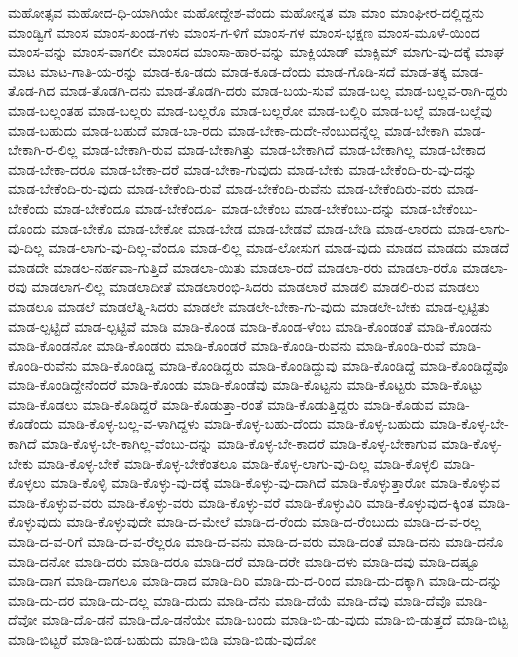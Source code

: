 {ಮಹೋತ್ಸವ
ಮಹೋದ-ಧಿ-ಯಾಗಿಯೇ
ಮಹೋದ್ದೇಶ-ವೆಂದು
ಮಹೋನ್ನತ
ಮಾ
ಮಾಂ
ಮಾಂಘೀರ-ದಲ್ಲಿದ್ದನು
ಮಾಂಡ್ವಿಗೆ
ಮಾಂಸ
ಮಾಂಸ-ಖಂಡ-ಗಳು
ಮಾಂಸ-ಗ-ಳಿಗೆ
ಮಾಂಸ-ಗಳ
ಮಾಂಸ-ಭಕ್ಷಣ
ಮಾಂಸ-ಮೂಳೆ-ಯಿಂದ
ಮಾಂಸ-ವನ್ನು
ಮಾಂಸ-ವಾಗಲೀ
ಮಾಂಸದ
ಮಾಂಸಾ-ಹಾರ-ವನ್ನು
ಮಾಕ್ಲಿಯಾಡ್
ಮಾಕ್ಸಿಮ್
ಮಾಗು-ವು-ದಕ್ಕೆ
ಮಾಘ
ಮಾಟ
ಮಾಟ-ಗಾತಿ-ಯ-ರನ್ನು
ಮಾಡ-ಕೂ-ಡದು
ಮಾಡ-ಕೂಡ-ದೆಂದು
ಮಾಡ-ಗೊಡಿ-ಸದೆ
ಮಾಡ-ತಕ್ಕ
ಮಾಡ-ತೊಡ-ಗಿದ
ಮಾಡ-ತೊಡಗಿ-ದನು
ಮಾಡ-ತೊಡಗಿ-ದರು
ಮಾಡ-ಬಯ-ಸುವೆ
ಮಾಡ-ಬಲ್ಲ
ಮಾಡ-ಬಲ್ಲವ-ರಾಗಿ-ದ್ದರು
ಮಾಡ-ಬಲ್ಲಂತಹ
ಮಾಡ-ಬಲ್ಲರು
ಮಾಡ-ಬಲ್ಲರೊ
ಮಾಡ-ಬಲ್ಲರೋ
ಮಾಡ-ಬಲ್ಲಿರಿ
ಮಾಡ-ಬಲ್ಲೆ
ಮಾಡ-ಬಲ್ಲೆವು
ಮಾಡ-ಬಹುದು
ಮಾಡ-ಬಹುದೆ
ಮಾಡ-ಬಾ-ರದು
ಮಾಡ-ಬೇಕಾ-ದುದೇ-ನೆಂಬುದನ್ನೆಲ್ಲ
ಮಾಡ-ಬೇಕಾಗಿ
ಮಾಡ-ಬೇಕಾಗಿ-ರ-ಲಿಲ್ಲ
ಮಾಡ-ಬೇಕಾಗಿ-ರುವ
ಮಾಡ-ಬೇಕಾಗಿತ್ತು
ಮಾಡ-ಬೇಕಾಗಿದೆ
ಮಾಡ-ಬೇಕಾಗಿಲ್ಲ
ಮಾಡ-ಬೇಕಾದ
ಮಾಡ-ಬೇಕಾ-ದರೂ
ಮಾಡ-ಬೇಕಾ-ದರೆ
ಮಾಡ-ಬೇಕಾ-ಗುವುದು
ಮಾಡ-ಬೇಕು
ಮಾಡ-ಬೇಕೆಂದಿ-ರು-ವು-ದನ್ನು
ಮಾಡ-ಬೇಕೆಂದಿ-ರು-ವುದು
ಮಾಡ-ಬೇಕೆಂದಿ-ರುವೆ
ಮಾಡ-ಬೇಕೆಂದಿ-ರುವೆನು
ಮಾಡ-ಬೇಕೆಂದಿರು-ವರು
ಮಾಡ-ಬೇಕೆಂದು
ಮಾಡ-ಬೇಕೆಂದೂ
ಮಾಡ-ಬೇಕೆಂದೂ-
ಮಾಡ-ಬೇಕೆಂಬ
ಮಾಡ-ಬೇಕೆಂಬು-ದನ್ನು
ಮಾಡ-ಬೇಕೆಂಬು-ದೊಂದು
ಮಾಡ-ಬೇಕೊ
ಮಾಡ-ಬೇಕೋ
ಮಾಡ-ಬೇಡ
ಮಾಡ-ಬೇಡವೆ
ಮಾಡ-ಬೇಡಿ
ಮಾಡ-ಲಾರದು
ಮಾಡ-ಲಾಗು-ವು-ದಿಲ್ಲ
ಮಾಡ-ಲಾಗು-ವು-ದಿಲ್ಲ-ವೆಂದೂ
ಮಾಡ-ಲಿಲ್ಲ
ಮಾಡ-ಲೋಸುಗ
ಮಾಡ-ವುದು
ಮಾಡದ
ಮಾಡದು
ಮಾಡದೆ
ಮಾಡದೇ
ಮಾಡಲ-ನರ್ಹವಾ-ಗುತ್ತಿದೆ
ಮಾಡಲಾ-ಯಿತು
ಮಾಡಲಾ-ರದೆ
ಮಾಡಲಾ-ರರು
ಮಾಡಲಾ-ರರೊ
ಮಾಡಲಾ-ರವು
ಮಾಡಲಾಗ-ಲಿಲ್ಲ
ಮಾಡಲಾದೀತೆ
ಮಾಡಲಾರಂಭಿ-ಸಿದರು
ಮಾಡಲಾರೆ
ಮಾಡಲಿ
ಮಾಡಲಿ-ರುವ
ಮಾಡಲು
ಮಾಡಲೂ
ಮಾಡಲೆ
ಮಾಡಲೆತ್ನಿ-ಸಿದರು
ಮಾಡಲೇ
ಮಾಡಲೇ-ಬೇಕಾ-ಗು-ವುದು
ಮಾಡಲೇ-ಬೇಕು
ಮಾಡ-ಲ್ಪಟ್ಟಿತು
ಮಾಡ-ಲ್ಪಟ್ಟಿದೆ
ಮಾಡ-ಲ್ಪಟ್ಟಿವೆ
ಮಾಡಿ
ಮಾಡಿ-ಕೊಂಡ
ಮಾಡಿ-ಕೊಂಡ-ಳೆಂಬ
ಮಾಡಿ-ಕೊಂಡಂತೆ
ಮಾಡಿ-ಕೊಂಡನು
ಮಾಡಿ-ಕೊಂಡನೋ
ಮಾಡಿ-ಕೊಂಡರು
ಮಾಡಿ-ಕೊಂಡರೆ
ಮಾಡಿ-ಕೊಂಡಿ-ರುವನು
ಮಾಡಿ-ಕೊಂಡಿ-ರುವೆ
ಮಾಡಿ-ಕೊಂಡಿ-ರುವೆನು
ಮಾಡಿ-ಕೊಂಡಿದ್ದ
ಮಾಡಿ-ಕೊಂಡಿದ್ದರು
ಮಾಡಿ-ಕೊಂಡಿದ್ದುವು
ಮಾಡಿ-ಕೊಂಡಿದ್ದೆ
ಮಾಡಿ-ಕೊಂಡಿದ್ದೆವೊ
ಮಾಡಿ-ಕೊಂಡಿದ್ದೇನೆಂದರೆ
ಮಾಡಿ-ಕೊಂಡು
ಮಾಡಿ-ಕೊಂಡೆವು
ಮಾಡಿ-ಕೊಟ್ಟನು
ಮಾಡಿ-ಕೊಟ್ಟರು
ಮಾಡಿ-ಕೊಟ್ಟು
ಮಾಡಿ-ಕೊಡಲು
ಮಾಡಿ-ಕೊಡಿದ್ದರೆ
ಮಾಡಿ-ಕೊಡುತ್ತಾ-ರಂತೆ
ಮಾಡಿ-ಕೊಡುತ್ತಿದ್ದರು
ಮಾಡಿ-ಕೊಡುವ
ಮಾಡಿ-ಕೊಡೆಂದು
ಮಾಡಿ-ಕೊಳ್ಳ-ಬಲ್ಲ-ವ-ಳಾಗಿದ್ದಳು
ಮಾಡಿ-ಕೊಳ್ಳ-ಬಹು-ದೆಂದು
ಮಾಡಿ-ಕೊಳ್ಳ-ಬಹುದು
ಮಾಡಿ-ಕೊಳ್ಳ-ಬೇ-ಕಾಗಿದೆ
ಮಾಡಿ-ಕೊಳ್ಳ-ಬೇ-ಕಾಗಿಲ್ಲ-ವೆಂಬು-ದನ್ನು
ಮಾಡಿ-ಕೊಳ್ಳ-ಬೇ-ಕಾದರೆ
ಮಾಡಿ-ಕೊಳ್ಳ-ಬೇಕಾಗುವ
ಮಾಡಿ-ಕೊಳ್ಳ-ಬೇಕು
ಮಾಡಿ-ಕೊಳ್ಳ-ಬೇಕೆ
ಮಾಡಿ-ಕೊಳ್ಳ-ಬೇಕೆಂತಲೂ
ಮಾಡಿ-ಕೊಳ್ಳ-ಲಾಗು-ವು-ದಿಲ್ಲ
ಮಾಡಿ-ಕೊಳ್ಳಲಿ
ಮಾಡಿ-ಕೊಳ್ಳಲು
ಮಾಡಿ-ಕೊಳ್ಳಿ
ಮಾಡಿ-ಕೊಳ್ಳು-ವು-ದಕ್ಕೆ
ಮಾಡಿ-ಕೊಳ್ಳು-ವು-ದಾಗಿದೆ
ಮಾಡಿ-ಕೊಳ್ಳುತ್ತಾರೋ
ಮಾಡಿ-ಕೊಳ್ಳುವ
ಮಾಡಿ-ಕೊಳ್ಳುವ-ವರು
ಮಾಡಿ-ಕೊಳ್ಳು-ವರು
ಮಾಡಿ-ಕೊಳ್ಳು-ವರೆ
ಮಾಡಿ-ಕೊಳ್ಳುವಿರಿ
ಮಾಡಿ-ಕೊಳ್ಳುವುದ-ಕ್ಕಿಂತ
ಮಾಡಿ-ಕೊಳ್ಳುವುದು
ಮಾಡಿ-ಕೊಳ್ಳುವುದೇ
ಮಾಡಿ-ದ-ಮೇಲೆ
ಮಾಡಿ-ದ-ರೆಂದು
ಮಾಡಿ-ದ-ರೆಂಬುದು
ಮಾಡಿ-ದ-ವ-ರಲ್ಲ
ಮಾಡಿ-ದ-ವ-ರಿಗೆ
ಮಾಡಿ-ದ-ವ-ರೆಲ್ಲರೂ
ಮಾಡಿ-ದ-ವನು
ಮಾಡಿ-ದ-ವರು
ಮಾಡಿ-ದಂತೆ
ಮಾಡಿ-ದನು
ಮಾಡಿ-ದನೊ
ಮಾಡಿ-ದನೋ
ಮಾಡಿ-ದರು
ಮಾಡಿ-ದರೂ
ಮಾಡಿ-ದರೆ
ಮಾಡಿ-ದರೇ
ಮಾಡಿ-ದಳು
ಮಾಡಿ-ದವು
ಮಾಡಿ-ದಷ್ಟೂ
ಮಾಡಿ-ದಾಗ
ಮಾಡಿ-ದಾಗಲೂ
ಮಾಡಿ-ದಾದ
ಮಾಡಿ-ದಿರಿ
ಮಾಡಿ-ದು-ದ-ರಿಂದ
ಮಾಡಿ-ದು-ದಕ್ಕಾಗಿ
ಮಾಡಿ-ದು-ದನ್ನು
ಮಾಡಿ-ದು-ದರ
ಮಾಡಿ-ದು-ದಲ್ಲ
ಮಾಡಿ-ದುದು
ಮಾಡಿ-ದೆನು
ಮಾಡಿ-ದೆಯೆ
ಮಾಡಿ-ದೆವು
ಮಾಡಿ-ದೆವೊ
ಮಾಡಿ-ದೆವೋ
ಮಾಡಿ-ದೊ-ಡನೆ
ಮಾಡಿ-ದೊ-ಡನೆಯೇ
ಮಾಡಿ-ಬಂದು
ಮಾಡಿ-ಬಿ-ಡು-ವುದು
ಮಾಡಿ-ಬಿ-ಡುತ್ತದೆ
ಮಾಡಿ-ಬಿಟ್ಟ
ಮಾಡಿ-ಬಿಟ್ಟರೆ
ಮಾಡಿ-ಬಿಡ-ಬಹುದು
ಮಾಡಿ-ಬಿಡಿ
ಮಾಡಿ-ಬಿಡು-ವುದೋ
}
